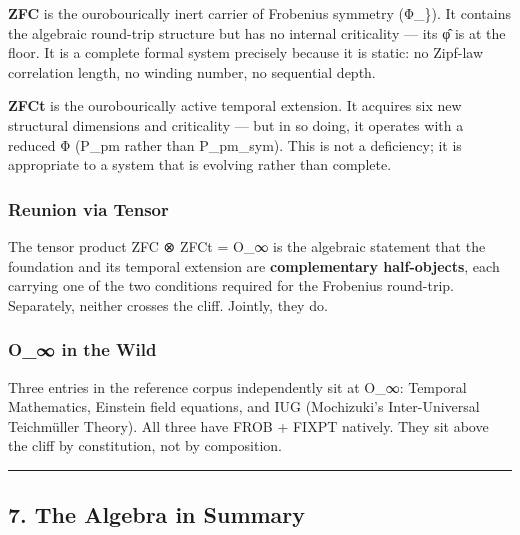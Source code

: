 \textbf{ZFC} is the ourobourically inert carrier of Frobenius symmetry
(Φ\_\}). It contains the algebraic round-trip structure but has no
internal criticality --- its φ̂ is at the floor. It is a complete formal
system precisely because it is static: no Zipf-law correlation length,
no winding number, no sequential depth.

\textbf{ZFCt} is the ourobourically active temporal extension. It
acquires six new structural dimensions and criticality --- but in so
doing, it operates with a reduced Φ (P\_pm rather than P\_pm\_sym). This
is not a deficiency; it is appropriate to a system that is evolving
rather than complete.

\subsubsection{Reunion via Tensor}\label{reunion-via-tensor}

The tensor product ZFC {\igprimfont\upshape ⊗} ZFCt = O\_∞ is the
algebraic statement that the foundation and its temporal extension are
\textbf{complementary half-objects}, each carrying one of the two
conditions required for the Frobenius round-trip. Separately, neither
crosses the cliff. Jointly, they do.

\subsubsection{O\_∞ in the Wild}\label{o_-in-the-wild}

Three entries in the reference corpus independently sit at O\_∞:
Temporal Mathematics, Einstein field equations, and IUG (Mochizuki's
Inter-Universal Teichmüller Theory). All three have FROB + FIXPT
natively. They sit above the cliff by constitution, not by composition.

\begin{center}\rule{0.5\linewidth}{0.5pt}\end{center}

\subsection{7. The Algebra in Summary}\label{the-algebra-in-summary}

